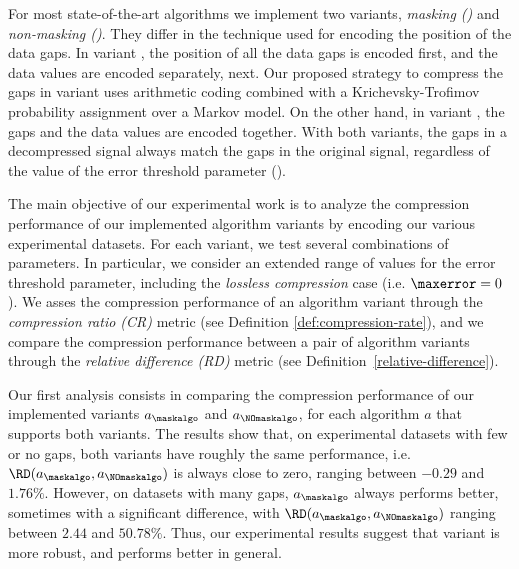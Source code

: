 For most state-of-the-art algorithms we implement two variants, \textit{masking (\maskalgo)} and \textit{non-masking (\NOmaskalgo)}. They differ in the technique used for encoding the position of the data gaps. In variant \maskalgo, the position of all the data gaps is encoded first, and the data values are encoded separately, next. Our proposed strategy to compress the gaps in variant \maskalgo uses arithmetic coding \cite{ac2, Cover2005} combined with a Krichevsky-Trofimov probability assignment \cite{ktestimator} over a Markov model. On the other hand, in variant \NOmaskalgo, the gaps and the data values are encoded together. With both variants, the gaps in a decompressed signal always match the gaps in the original signal, regardless of the value of the error threshold parameter (\maxerror).


\clearpage


The main objective of our experimental work is to analyze the compression performance of our implemented algorithm variants by encoding our various experimental datasets. For each variant, we test several combinations of parameters. In particular, we consider an extended range of values for the error threshold parameter, including the \textit{lossless compression} case (i.e. $\maxerror=0$). We asses the compression performance of an algorithm variant through the \textit{compression ratio (CR)} metric (see Definition \ref{def:compression-rate}), and we compare the compression performance between a pair of algorithm variants through the \textit{relative difference (RD)} metric (see Definition~\ref{relative-difference}). 


Our first analysis consists in comparing the compression performance of our implemented variants $a_\maskalgo$ and $a_\NOmaskalgo$, for each algorithm $a$ that supports both variants. The results show that, on experimental datasets with few or no gaps, both variants have roughly the same performance, i.e. $\RD(a_\maskalgo, a_\NOmaskalgo)$ is always close to zero, ranging between $-0.29$ and $1.76\%$. However, on datasets with many gaps, $a_\maskalgo$ always performs better, sometimes with a significant difference, with $\RD(a_\maskalgo, a_\NOmaskalgo)$ ranging between $2.44$ and $50.78\%$. Thus, our experimental results suggest that variant \maskalgo is more robust, and performs better in general.


